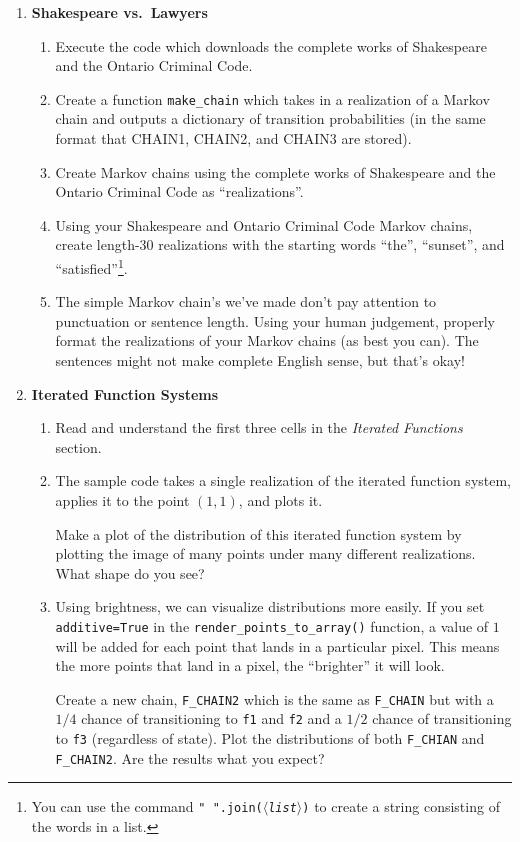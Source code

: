 \documentclass[letter]{article}
\newcommand{\var}[1]{{$\langle$\it #1$\rangle$}}
\begin{document}
\begin{enumerate}
		\item {\bf Shakespeare vs.~Lawyers}
		\begin{enumerate}
			\item Execute the code which downloads the complete works of Shakespeare and the Ontario Criminal Code.
			\item Create a function \verb|make_chain| which takes in a realization of a Markov chain and outputs
				a dictionary of transition probabilities (in the same format that CHAIN1, CHAIN2, and CHAIN3
				are stored).
			\item Create Markov chains using the complete works of Shakespeare and the Ontario Criminal Code
				as ``realizations''.
			\item Using your Shakespeare and Ontario Criminal Code Markov chains, create length-30 realizations
				with the starting words ``the'', ``sunset'', and ``satisfied''\footnote{ You can use the command
				{\tt " ".join(\var{list})} to create a string consisting of the words in a list.}.
			\item The simple Markov chain's we've made don't pay attention to punctuation or sentence length. Using
				your human judgement, properly format the realizations of your Markov chains (as best you can).
				The sentences might not make complete English sense, but that's okay!
		\end{enumerate}
	\item {\bf Iterated Function Systems}
		\begin{enumerate}
			\item Read and understand the first three cells in the \emph{Iterated Functions} section.
			\item The sample code takes a single realization of the iterated function system, applies
				it to the point $(1,1)$, and plots it.

				Make a plot of the distribution of this iterated function system by plotting the image
				of many points under many different realizations. What shape do you see?
			\item Using brightness, we can visualize distributions more easily. If you set {\tt additive=True}
				in the \verb|render_points_to_array()| function, a value of $1$ will be added for each
				point that lands in a particular pixel. This means the more points that land in a pixel,
				the ``brighter'' it will look.

				Create a new chain, \verb|F_CHAIN2| which is the same as \verb|F_CHAIN| but with a $1/4$ chance
				of transitioning to {\tt f1} and {\tt f2} and a $1/2$ chance of transitioning to {\tt f3} 
				(regardless of state). Plot the distributions of both \verb|F_CHIAN| and \verb|F_CHAIN2|. Are the 
				results what you expect?


\end{enumerate}
\end{enumerate}
\end{document}
